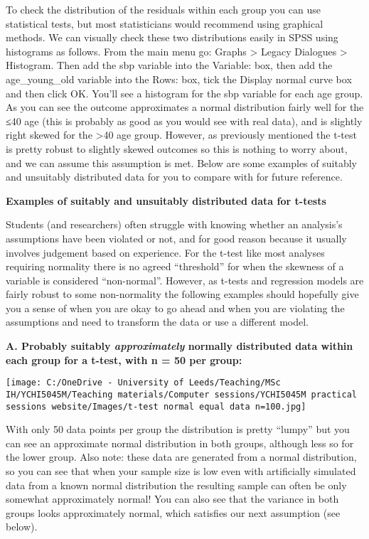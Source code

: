 \documentclass[
]{book}
\begin{document}
To check the distribution of the residuals within each group you can use statistical tests, but most statisticians would recommend using graphical methods. We can visually check these two distributions easily in SPSS using histograms as follows. From the main menu go: Graphs \textgreater{} Legacy Dialogues \textgreater{} Histogram. Then add the sbp variable into the Variable: box, then add the age\_young\_old variable into the Rows: box, tick the Display normal curve box and then click OK. You'll see a histogram for the sbp variable for each age group. As you can see the outcome approximates a normal distribution fairly well for the ≤40 age (this is probably as good as you would see with real data), and is slightly right skewed for the \textgreater40 age group. However, as previously mentioned the t-test is pretty robust to slightly skewed outcomes so this is nothing to worry about, and we can assume this assumption is met. Below are some examples of suitably and unsuitably distributed data for you to compare with for future reference.

\textbf{Examples of suitably and unsuitably distributed data for t-tests}

Students (and researchers) often struggle with knowing whether an analysis's assumptions have been violated or not, and for good reason because it usually involves judgement based on experience. For the t-test like most analyses requiring normality there is no agreed ``threshold'' for when the skewness of a variable is considered ``non-normal''. However, as t-tests and regression models are fairly robust to some non-normality the following examples should hopefully give you a sense of when you are okay to go ahead and when you are violating the assumptions and need to transform the data or use a different model.

\textbf{A. Probably suitably \emph{approximately} normally distributed data within each group for a t-test, with n = 50 per group:}

\texttt{[image: C:/OneDrive - University of Leeds/Teaching/MSc IH/YCHI5045M/Teaching materials/Computer sessions/YCHI5045M practical sessions website/Images/t-test normal equal data n=100.jpg]}

With only 50 data points per group the distribution is pretty ``lumpy'' but you can see an approximate normal distribution in both groups, although less so for the lower group. Also note: these data are generated from a normal distribution, so you can see that when your sample size is low even with artificially simulated data from a known normal distribution the resulting sample can often be only somewhat approximately normal! You can also see that the variance in both groups looks approximately normal, which satisfies our next assumption (see below).
\end{document}
